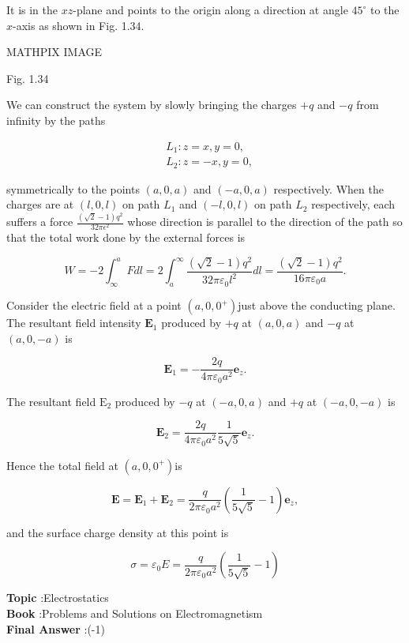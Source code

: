 \documentclass[10pt]{article}
\begin{document}
It is in the $x z$-plane and points to the origin along a direction at angle $45^{\circ}$ to the $x$-axis as shown in Fig. 1.34.

MATHPIX IMAGE

Fig. 1.34

 We can construct the system by slowly bringing the charges $+q$ and $-q$ from infinity by the paths

$$
\begin{aligned}
&L_{1}: z=x, y=0, \\
&L_{2}: z=-x, y=0,
\end{aligned}
$$

symmetrically to the points $(a, 0, a)$ and $(-a, 0, a)$ respectively. When the charges are at $(l, 0, l)$ on path $L_{1}$ and $(-l, 0, l)$ on path $L_{2}$ respectively, each suffers a force $\frac{(\sqrt{2}-1) q^{2}}{32 \pi \epsilon^{2}}$ whose direction is parallel to the direction of the path so that the total work done by the external forces is

$$
W=-2 \int_{\infty}^{a} F d l=2 \int_{a}^{\infty} \frac{(\sqrt{2}-1) q^{2}}{32 \pi \varepsilon_{0} l^{2}} d l=\frac{(\sqrt{2}-1) q^{2}}{16 \pi \varepsilon_{0} a} .
$$

 Consider the electric field at a point $\left(a, 0,0^{+}\right)$just above the conducting plane. The resultant field intensity $\mathbf{E}_{1}$ produced by $+q$ at $(a, 0, a)$ and $-q$ at $(a, 0,-a)$ is

$$
\mathbf{E}_{1}=-\frac{2 q}{4 \pi \varepsilon_{0} a^{2}} \mathbf{e}_{z} .
$$

The resultant field $\mathrm{E}_{2}$ produced by $-q$ at $(-a, 0, a)$ and $+q$ at $(-a, 0,-a)$ is

$$
\mathbf{E}_{2}=\frac{2 q}{4 \pi \varepsilon_{0} a^{2}} \frac{1}{5 \sqrt{5}} \mathbf{e}_{z} .
$$

Hence the total field at $\left(a, 0,0^{+}\right)$is

$$
\mathbf{E}=\mathbf{E}_{1}+\mathbf{E}_{2}=\frac{q}{2 \pi \varepsilon_{0} a^{2}}\left(\frac{1}{5 \sqrt{5}}-1\right) \mathbf{e}_{z},
$$

and the surface charge density at this point is

$$
\sigma=\varepsilon_{0} E=\frac{q}{2 \pi \varepsilon_{0} a^{2}}\left(\frac{1}{5 \sqrt{5}}-1\right)
$$

\textbf{Topic} :Electrostatics\\
\textbf{Book} :Problems and Solutions on Electromagnetism\\
\textbf{Final Answer} :\left(-1\right)\\
\end{document}

